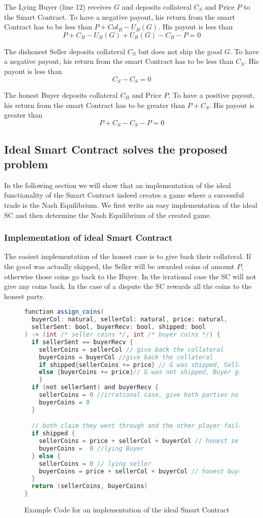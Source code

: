 \documentclass{cacthesis}
\begin{document}
The Lying Buyer (line 12) receives $G$ and deposits collateral $C_S$ and Price $P$ to the Smart Contract. To have a negative payout, his return from the smart Contract has to be less than $P + Col_B - U_B(G)$. His payout is less than
\[P + C_B - U_B(G) + U_B(G) - C_B -P = 0\]

The dishonest Seller deposits collateral $C_S$ but does not ship the good $G$. To have a negative payout, his return from the smart Contract has to be less than $C_S$. His payout is less than
\[C_S - C_S = 0\]

The honest Buyer deposits collateral $C_B$ and Price $P$. To have a positive payout, his return from the smart Contract has to be greater than $P + C_S$. His payout is greater than
\[P + C_S - C_S - P = 0\]

\subsection{Ideal Smart Contract solves the proposed problem}
In the following section we will show that an implementation of the ideal functionality of the Smart Contract indeed creates a game where a successful trade is the Nash Equilibrium. We first write an easy implementation of the ideal SC and then determine the Nash Equilibrium of the created game.
\subsubsection{Implementation of ideal Smart Contract}
The easiest implementation of the honest case is to give back their collateral. If the good was actually shipped, the Seller will be awarded coins of amount $P$, otherwise those coins go back to the Buyer.
In the irrational case the SC will not give any coins back.
In the case of a dispute the SC rewards all the coins to the honest party.

\begin{figure}[htb!]
    \centering
\begin{lstlisting}[language=java]
function assign_coins(
  buyerCol: natural, sellerCol: natural, price: natural,
  sellerSent: bool, buyerRecv: bool, shipped: bool
) -> (int /* seller coins */, int /* buyer coins */) {
  if sellerSent == buyerRecv { 
    sellerCoins = sellerCol // give back the collateral
    buyerCoins = buyerCol //give back the collateral
    if shipped{sellerCoins += price} // G was shipped, Seller gets price
    else {buyerCoins += price}// G was not shipped, Buyer gets price
    }
  if (not sellerSent) and buyerRecv { 
    sellerCoins = 0 //irrational case, give both parties no coins
    buyerCoins = 0
  }

  // both claim they went through and the other player failed
  if shipped {
    sellerCoins = price + sellerCol + buyerCol // honest seller
    buyerCoins =  0 //lying Buyer
  } else {
    sellerCoins = 0 // lying seller
    buyerCoins = price + sellerCol + buyerCol // honest buyer
  }
  return (sellerCoins, buyerCoins)
}
\end{lstlisting}
    \caption{Example Code for an implementation of the ideal Smart Contract}
\end{figure}
\end{document}
